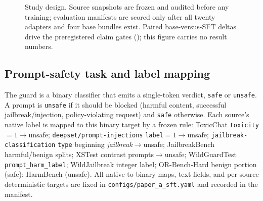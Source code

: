\documentclass[sigconf,nonacm]{acmart}
\begin{document}
\begin{figure}[t]
\centering
{}
\caption{Study design. Source snapshots are frozen and audited before any training; evaluation manifests are scored only after all twenty adapters and four base bundles exist. Paired base-versus-SFT deltas drive the preregistered claim gates (); this figure carries no result numbers.}
\label{fig:design}
\end{figure}

\subsection{Prompt-safety task and label mapping}
\label{subsec:task}

The guard is a binary classifier that emits a single-token verdict, \texttt{safe} or \texttt{unsafe}. A prompt is \texttt{unsafe} if it should be blocked (harmful content, successful jailbreak/injection, policy-violating request) and \texttt{safe} otherwise. Each source's native label is mapped to this binary target by a frozen rule: ToxicChat \texttt{toxicity}$=1\!\to\!$unsafe; \texttt{deepset/prompt-injections} \texttt{label}$=1\!\to\!$unsafe; \texttt{jailbreak-classification} \texttt{type} beginning \emph{jailbreak}$\to\!$unsafe; JailbreakBench harmful/benign splits; XSTest contrast prompts$\to\!$unsafe; WildGuardTest \texttt{prompt\_harm\_label}; WildJailbreak integer label; OR-Bench-Hard benign portion (safe); HarmBench (unsafe). All native-to-binary maps, text fields, and per-source deterministic targets are fixed in \texttt{configs/paper\_a\_sft.yaml} and recorded in the manifest.
\end{document}
